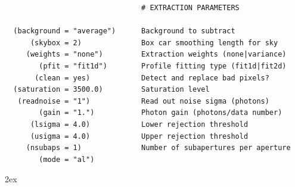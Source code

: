 \documentclass[letter,11pt,oneside]{article}
\begin{document}
\begin{verbatim}
                                # EXTRACTION PARAMETERS
                                
  (background = "average")      Background to subtract
      (skybox = 2)              Box car smoothing length for sky
     (weights = "none")         Extraction weights (none|variance)
        (pfit = "fit1d")        Profile fitting type (fit1d|fit2d)
       (clean = yes)            Detect and replace bad pixels?
  (saturation = 3500.0)         Saturation level
   (readnoise = "1")            Read out noise sigma (photons)
        (gain = "1.")           Photon gain (photons/data number)
      (lsigma = 4.0)            Lower rejection threshold
      (usigma = 4.0)            Upper rejection threshold
     (nsubaps = 1)              Number of subapertures per aperture
        (mode = "al")           
\end{verbatim}
\endgroup



\clearpage
\renewcommand*{\refname}{Bibliography and References}


{}
\printindex %
 \label{sec:index}




\begingroup
\renewcommand{\notesname}{\textcolor{red} {Action Items:}}
\parindent 0pt
\parskip 2ex
{}
\def\enotesize{\normalsize}
\theendnotes
\endgroup
\end{document}
